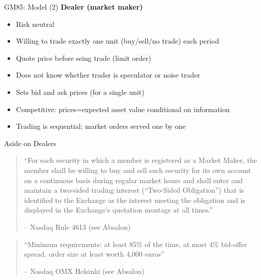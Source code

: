 \documentclass[english,10pt]{beamer}
\begin{document}
\begin{frame}{GM85: Model (2)}
	\textbf{Dealer (market maker)}
	\begin{itemize}
		\item Risk neutral
		\item Willing to trade \alert{exactly one unit} (buy/sell/no trade) each period
		\item Quote price before seing trade (limit order)
		\item Does not know whether trader is speculator or noise trader
		\item Sets \alert{bid and ask prices} (for a single unit)
		\item Competitive: prices=expected asset value conditional on information
		\item Trading is sequential: market orders served one by one
	\end{itemize}
\end{frame}


\begin{frame}{Aside on Dealers}
	\begin{quotation}
		\small ``For each security in which a member is registered as a Market Maker, the member shall be willing to buy and sell such security for its own account on a continuous basis during regular market hours and shall enter and maintain a two-sided trading interest (``Two-Sided Obligation'') that is identified to the Exchange as the interest meeting the obligation and is displayed in the Exchange's quotation montage at all times.''
		\begin{flushright}
			-- Nasdaq Rule 4613 (see Absalon)
		\end{flushright}
	\end{quotation}
	\vspace{3ex}
	\begin{quotation}
		\small ``Minimum requirements: at least 85\% of the time, at most 4\% bid-offer
		spread, order size at least worth 4,000 euros''
		\begin{flushright}
			-- Nasdaq OMX Helsinki (see Absalon)
		\end{flushright}
	\end{quotation}
\end{frame}
\end{document}
